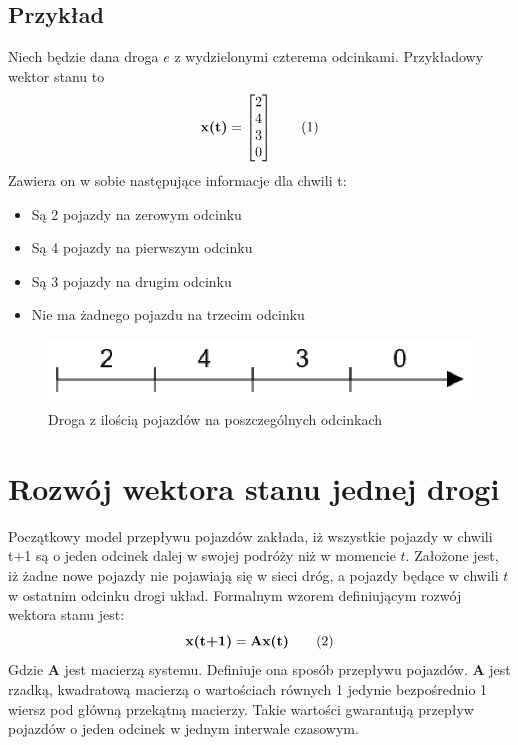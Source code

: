 \documentclass[12pt]{book}
\theoremstyle{plain}
\newcommand\addtag{\refstepcounter{equation}
\renewcommand{\labelenumii}{\theenumii}
\renewcommand{\theenumii}{\theenumi.\arabic{enumii}.}
\tag{\theequation}}
\begin{document}
\subsection{Przykład} \label{subsec:example-single-road}
Niech będzie dana droga $e$ z wydzielonymi czterema odcinkami. Przykładowy wektor stanu to
\[\textbf{x(t)}=\begin{bmatrix}
2 \\ 4 \\ 3 \\ 0
\end{bmatrix} \addtag \]
Zawiera on w sobie następujące informacje dla chwili t:
\begin{itemize}
	\item Są 2 pojazdy na zerowym odcinku
	\item Są 4 pojazdy na pierwszym odcinku
	\item Są 3 pojazdy na drugim odcinku
	\item Nie ma żadnego pojazdu na trzecim odcinku
\end{itemize}

\begin{figure}[H]
	\centering
	\includegraphics[width=14cm]{images/1_droga_4_odcinki}
	\caption{Droga z ilością pojazdów na poszczególnych odcinkach}
	\label{fig:single_road}
\end{figure}
\section{Rozwój wektora stanu jednej drogi}
Początkowy model przepływu pojazdów zakłada, iż wszystkie pojazdy w chwili t+1 są o jeden odcinek dalej w swojej podróży niż w momencie $t$. Założone jest, iż żadne nowe pojazdy nie pojawiają się w sieci dróg, a pojazdy będące w chwili $t$ w ostatnim odcinku drogi układ. Formalnym wzorem definiującym rozwój wektora stanu jest:
\[\textbf{x(t+1)}=\textbf{Ax(t)} \addtag \label{eq:single_road} \]
Gdzie $\textbf{A}$ jest macierzą systemu. Definiuje ona sposób przepływu pojazdów. $\textbf{A}$ jest rzadką, kwadratową macierzą o wartościach równych 1 jedynie bezpośrednio 1 wiersz pod główną przekątną macierzy. Takie wartości gwarantują przepływ pojazdów o jeden odcinek w jednym interwale czasowym.
\end{document}
